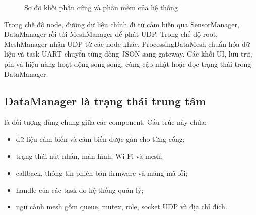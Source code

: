 \documentclass[a4paper]{article}
\newcommand{\codeword}[1]{\texttt{\detokenize{#1}}}
\begin{document}
\begin{figure}[ht]
  \caption{Sơ đồ khối phần cứng và phần mềm của hệ thống}
\end{figure}

Trong chế độ node, đường dữ liệu chính đi từ cảm biến qua SensorManager,
DataManager rồi tới MeshManager để phát UDP. Trong chế độ root, MeshManager
nhận UDP từ các node khác, ProcessingDataMesh chuẩn hóa dữ liệu và task UART
chuyển từng dòng JSON sang gateway. Các khối UI, lưu trữ, pin và hiệu năng hoạt
động song song, cùng cập nhật hoặc đọc trạng thái trong DataManager.

\subsection{DataManager là trạng thái trung tâm}

\codeword{DataManager_t} là đối tượng dùng chung giữa các component. Cấu trúc
này chứa:

\begin{itemize}
  \item dữ liệu cảm biến và cảm biến được gán cho từng cổng;
  \item trạng thái nút nhấn, màn hình, Wi-Fi và mesh;
  \item callback, thông tin phiên bản firmware và mảng mã lỗi;
  \item handle của các task do hệ thống quản lý;
  \item ngữ cảnh mesh gồm queue, mutex, role, socket UDP và địa chỉ đích.
\end{itemize}
\end{document}
